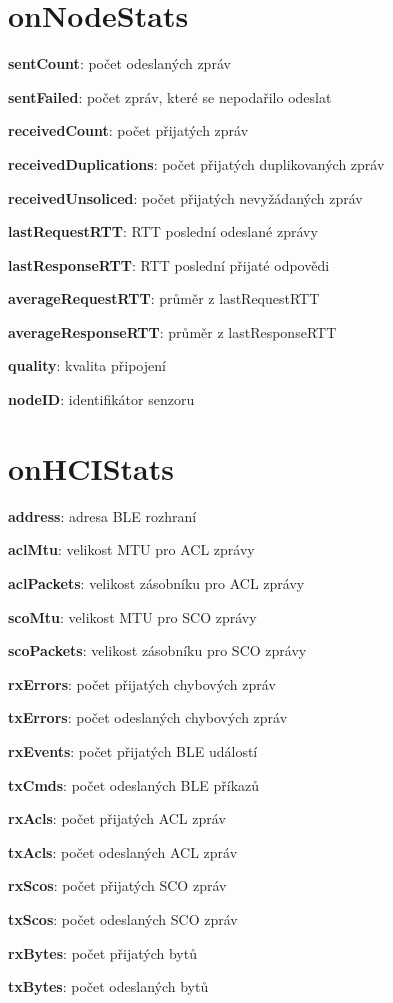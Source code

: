 \documentclass[thesis=M,czech]{FITthesis}[2012/06/26]
\begin{document}
\section{onNodeStats}
\begin{description}
 \item \textbf{sentCount}: počet odeslaných zpráv
 \item \textbf{sentFailed}: počet zpráv, které se nepodařilo odeslat
 \item \textbf{receivedCount}: počet přijatých zpráv
 \item \textbf{receivedDuplications}: počet přijatých duplikovaných zpráv
 \item \textbf{receivedUnsoliced}: počet přijatých nevyžádaných zpráv
 \item \textbf{lastRequestRTT}: RTT poslední odeslané zprávy
 \item \textbf{lastResponseRTT}: RTT poslední přijaté odpovědi
 \item \textbf{averageRequestRTT}: průměr z lastRequestRTT
 \item \textbf{averageResponseRTT}: průměr z lastResponseRTT
 \item \textbf{quality}: kvalita připojení
 \item \textbf{nodeID}: identifikátor senzoru
\end{description}

\section{onHCIStats}
\begin{description}
 \item \textbf{address}: adresa BLE rozhraní 
 \item \textbf{aclMtu}: velikost MTU pro ACL zprávy
 \item \textbf{aclPackets}: velikost zásobníku pro ACL zprávy 
 \item \textbf{scoMtu}: velikost MTU pro SCO zprávy
 \item \textbf{scoPackets}: velikost zásobníku pro SCO zprávy
 \item \textbf{rxErrors}: počet přijatých chybových zpráv
 \item \textbf{txErrors}: počet odeslaných chybových zpráv
 \item \textbf{rxEvents}: počet přijatých BLE událostí
 \item \textbf{txCmds}: počet odeslaných BLE příkazů
 \item \textbf{rxAcls}: počet přijatých ACL zpráv
 \item \textbf{txAcls}: počet odeslaných ACL zpráv
 \item \textbf{rxScos}: počet přijatých SCO zpráv
 \item \textbf{txScos}: počet odeslaných SCO zpráv
 \item \textbf{rxBytes}: počet přijatých bytů
 \item \textbf{txBytes}: počet odeslaných bytů
\end{description}
\end{document}
